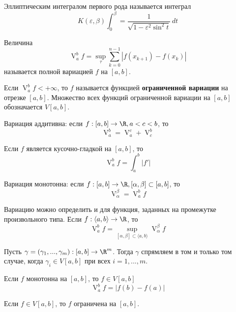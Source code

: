 \begin{Rem}
	Эллиптическим интегралом первого рода называется интеграл
	\[K(\varepsilon, \beta) \int_0^\beta = \frac{1}{\sqrt{1 - \varepsilon^2 \sin^2 t}} \,dt\]
\end{Rem}


\begin{Def}
	Величина
	\[\mathop{V}_a^b f = \sup_\tau \sum_{k=0}^{n - 1} |f(x_{k + 1}) - f(x_k)|\]
	называется полной вариацией $f$ на $[a, b]$. 

	Если $\mathop{V}_a^b f < +\infty$, то $f$ называется функцией \textbf{ограниченной вариации} на отрезке $[a, b]$.
	Множество всех функций ограниченной вариации на $[a, b]$ обозначается $V[a, b]$. 
\end{Def}

\begin{Thm}[Свойства]
	\begin{MyList}
		\item Вариация аддитивна: если $f : [a, b] \to \R, a < c < b$, то
		\[\mathop{V}_a^b = \mathop{V}_a^c + \mathop{V}_c^b\]

		\item Если $f$ является кусочно-гладкой на $[a, b]$, то
		\[\mathop{V}_a^b f = \int_a^b |f'|\]

		\item Вариация монотонна: если $f : [a, b] \to \R, [\alpha, \beta] \subset [a, b]$, то
		\[\mathop{V}_\alpha^\beta = \mathop{V}_a^b f\]

		Вариацию можно определить и для функция, заданных на промежутке произвольного типа.
		Если $f : \langle a, b\rangle \to \R$, то
		\[\mathop{V}_a^b f = \sup_{[\alpha, \beta] \subset \langle a, b\rangle} \mathop{V}_\alpha^\beta f\]

		\item Пусть $\gamma = (\gamma_1, ..., \gamma_m) : [a, b] \to \R^m$. Тогда $\gamma$ спрямляем в том и только том случае, когда $\gamma_i \in V[a, b]$ при всех $i = 1, ..., m$.
		\item Если $f$ монотонна на $[a, b]$, то $f \in V[a, b]$ 
		\[\mathop{V}_a^b f = |f(b) - f(a)|\]
		\item Если $f \in V[a, b]$, то $f$ ограничена на $[a, b]$.
	\end{MyList}
\end{Thm}

